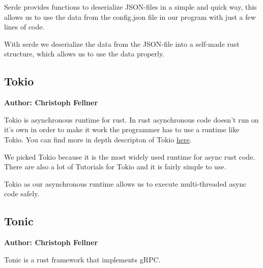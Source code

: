 Serde provides functions to deserialize JSON-files in a simple and quick way, this allows us to use the data from the config.json file in our program with just a few lines of code.

With serde we deserialize the data from the JSON-file into a self-made rust structure, which allows us to use the data properly.  

\subsection{Tokio}
\textbf{Author: Christoph Fellner}

Tokio is asynchronous runtime for rust. In rust asynchronous code doesn't run on it's own in order to make it work the programmer has to use a runtime like Tokio. You can find more in depth descripton of Tokio \href{https://tokio.rs/tokio/tutorial}{here}. 

We picked Tokio because it is the most widely used runtime for async rust code. There are also a lot of Tutorials for Tokio and it is fairly simple to use.

Tokio as our asynchronous runtime allows us to execute multi-threaded async code safely.  

\subsection{Tonic}
\textbf{Author: Christoph Fellner}

Tonic is a rust framework that implements gRPC.

\filbreak
